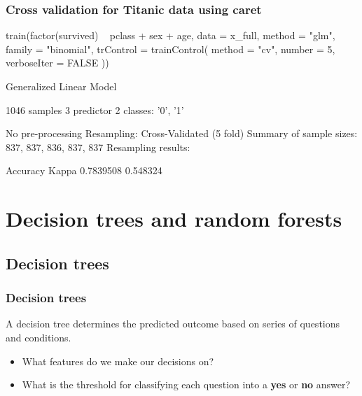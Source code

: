 \documentclass[a4paper]{article}\usepackage[]{graphicx}\usepackage[]{xcolor}
\begin{document}
\subsubsection{Cross validation for Titanic data using caret}
\begin{Schunk}
\begin{Sinput}
train(factor(survived) ~ pclass + sex + age,
      data = x_full, 
      method = "glm",
      family = "binomial",
      trControl = trainControl(
        method = "cv", number = 5,
        verboseIter = FALSE
      ))
\end{Sinput}
\begin{Soutput}
Generalized Linear Model 

1046 samples
   3 predictor
   2 classes: '0', '1' 

No pre-processing
Resampling: Cross-Validated (5 fold) 
Summary of sample sizes: 837, 837, 836, 837, 837 
Resampling results:

  Accuracy   Kappa   
  0.7839508  0.548324
\end{Soutput}
\end{Schunk}
\newpage
\section{Decision trees and random forests}\label{sec:32}
\subsection{Decision trees}
\subsubsection{Decision trees}
A decision tree determines the predicted outcome based on series of questions and conditions.
\begin{tcolorbox}[greenstylecolor, title=How to build a tree?]
	\begin{itemize}
		\item What features do we make our decisions on?
		\item What is the threshold for classifying each question into a \textbf{yes} or \textbf{no} answer?
	\end{itemize}
\end{tcolorbox}
\end{document}

